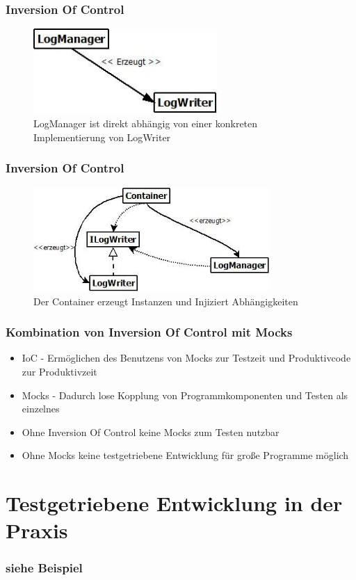 \documentclass{beamer}
\begin{document}
\begin{frame}
\frametitle{Inversion Of Control}
\begin{figure}[htbp]
\includegraphics[width=7cm]{logging_closeCoupled.jpg}
\caption{LogManager ist direkt abhängig von einer konkreten Implementierung von LogWriter}
\end{figure}
\end{frame}

\begin{frame}
\frametitle{Inversion Of Control}
\begin{figure}[htbp]
\includegraphics[width=9cm]{logging_looseCoupled.jpg}
\caption{Der Container erzeugt Instanzen und Injiziert Abhängigkeiten}
\end{figure}
\end{frame}

\begin{frame}
\frametitle{Kombination von Inversion Of Control mit Mocks}
\begin{itemize}
\item IoC - Ermöglichen des Benutzens von Mocks zur Testzeit und Produktivcode zur Produktivzeit
\item Mocks - Dadurch lose Kopplung von Programmkomponenten und Testen als einzelnes\\
\item Ohne Inversion Of Control keine Mocks zum Testen nutzbar
\item Ohne Mocks keine testgetriebene Entwicklung für große Programme möglich
\end{itemize}
\end{frame}

\section{Testgetriebene Entwicklung in der Praxis}
\begin{frame}
\frametitle{siehe Beispiel}
\end{frame}
\end{document}
